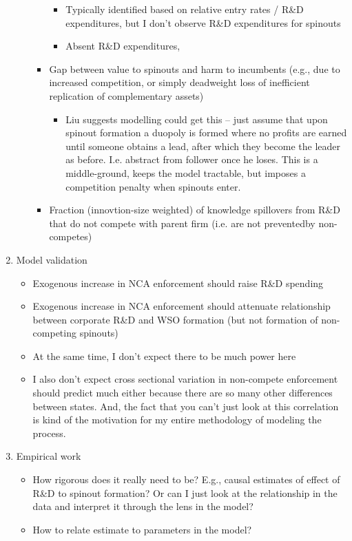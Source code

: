 \documentclass[12pt,english]{article}
\theoremstyle{remark}
\begin{document}
\begin{enumerate}
\begin{itemize}
\begin{itemize}
			\begin{itemize}
				\item Typically identified based on relative entry rates / R\&D expenditures, but I don't observe R\&D expenditures for spinouts
				\item Absent R\&D expenditures, 
			\end{itemize}
			\item Gap between value to spinouts and harm to incumbents (e.g., due to increased competition, or simply deadweight loss of inefficient replication of complementary assets)
			\begin{itemize}
				\item Liu suggests modelling could get this -- just assume that upon spinout formation a duopoly is formed where no profits are earned until someone obtains a lead, after which they become the leader as before. I.e. abstract from follower once he loses. This is a middle-ground, keeps the model tractable, but imposes a competition penalty when spinouts enter. 
			\end{itemize}
			\item Fraction (innovtion-size weighted) of knowledge spillovers from R\&D that do not compete with parent firm (i.e. are not preventedby non-competes)
		\end{itemize}
	\end{itemize}
	\item Model validation
	\begin{itemize}
		\item Exogenous increase in NCA enforcement should raise R\&D spending
		\item Exogenous increase in NCA enforcement should attenuate relationship between corporate R\&D and WSO formation (but not formation of non-competing spinouts)
		\item At the same time, I don't expect there to be much power here
		\item I also don't expect cross sectional variation in non-compete enforcement should predict much either because there are so many other differences between states. And, the fact that you can't just look at this correlation is kind of the motivation for my entire methodology of modeling the process.
	\end{itemize}
	\item Empirical work
	\begin{itemize}
		\item How rigorous does it really need to be? E.g., causal estimates of effect of R\&D to spinout formation? Or can I just look at the relationship in the data and interpret it through the lens in the model?
		\item How to relate estimate to parameters in the model? 
	\end{itemize}
\end{enumerate}
\end{document}

